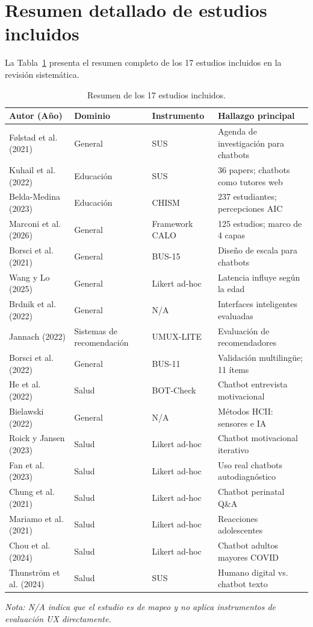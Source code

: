 \documentclass[11pt,twocolumn]{article}
\begin{document}
\appendix
\section{Resumen detallado de estudios incluidos}
\label{app:estudios}

La Tabla~\ref{tab:estudios} presenta el resumen completo de los 17 estudios incluidos en la revisión sistemática.

\begin{table}[t]
\centering
\caption{Resumen de los 17 estudios incluidos.}
\label{tab:estudios}
\begin{tabular}{@{}p{3cm}p{2cm}p{2cm}p{6.5cm}@{}}
\toprule
\textbf{Autor (Año)} & \textbf{Dominio} & \textbf{Instrumento} & \textbf{Hallazgo principal} \\
\midrule
Følstad et al. (2021) & General & SUS & Agenda de investigación para chatbots \\
Kuhail et al. (2022) & Educación & SUS & 36 papers; chatbots como tutores web \\
Belda-Medina (2023) & Educación & CHISM & 237 estudiantes; percepciones AIC \\
Marconi et al. (2026) & General & Framework CALO & 125 estudios; marco de 4 capas \\
Borsci et al. (2021) & General & BUS-15 & Diseño de escala para chatbots \\
Wang y Lo (2025) & General & Likert ad-hoc & Latencia influye según la edad \\
Brdnik et al. (2022) & General & N/A & Interfaces inteligentes evaluadas \\
Jannach (2022) & Sistemas de recomendación & UMUX-LITE & Evaluación de recomendadores \\
Borsci et al. (2022) & General & BUS-11 & Validación multilingüe; 11 ítems \\
He et al. (2022) & Salud & BOT-Check & Chatbot entrevista motivacional \\
Bielawski (2022) & General & N/A & Métodos HCII: sensores e IA \\
Roick y Jansen (2023) & Salud & Likert ad-hoc & Chatbot motivacional iterativo \\
Fan et al. (2023) & Salud & Likert ad-hoc & Uso real chatbots autodiagnóstico \\
Chung et al. (2021) & Salud & Likert ad-hoc & Chatbot perinatal Q\&A \\
Mariamo et al. (2021) & Salud & Likert ad-hoc & Reacciones adolescentes \\
Chou et al. (2024) & Salud & Likert ad-hoc & Chatbot adultos mayores COVID \\
Thunström et al. (2024) & Salud & SUS & Humano digital vs. chatbot texto \\
\bottomrule
\end{tabular}

\footnotesize \textit{Nota: N/A indica que el estudio es de mapeo y no aplica instrumentos de evaluación UX directamente.}
\end{table}
\end{document}
